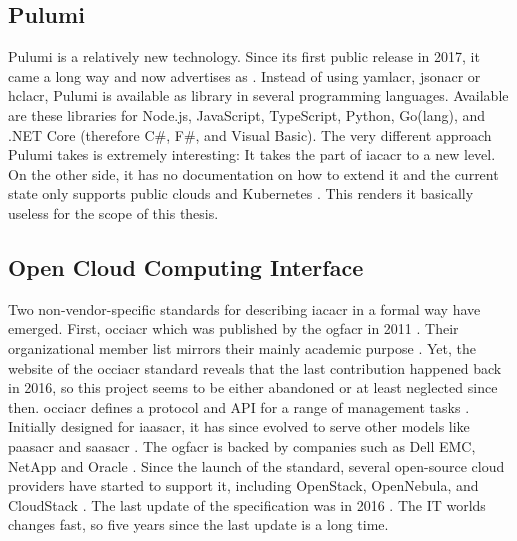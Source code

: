 \subsection{Pulumi}
Pulumi is a relatively new technology. Since its first public release in 2017, it came a long way and now advertises as  \cite{github_pulumi_first_release} \cite{github_pulumi}. Instead of using \gls{yamlacr}, \gls{jsonacr} or \gls{hclacr}, Pulumi is available as library in several programming languages. Available are these libraries for Node.js, JavaScript, TypeScript, Python, Go(lang), and .NET Core (therefore C\#, F\#, and Visual Basic).
\newline
The very different approach Pulumi takes is extremely interesting: It takes the  part of \gls{iacacr} to a new level. On the other side, it has no documentation on how to extend it and the current state only supports public clouds and Kubernetes \cite{pulumi_providers}. This renders it basically useless for the scope of this thesis.

\subsection{Open Cloud Computing Interface} %
Two non-vendor-specific standards for describing \gls{iacacr} in a formal way have emerged. First, \gls{occiacr} which was published by the \gls{ogfacr} in 2011 \cite{occi_core}. Their organizational member list mirrors their mainly academic purpose \cite{ogf_members}. Yet, the website of the \gls{occiacr} standard reveals that the last contribution happened back in 2016, so this project seems to be either abandoned or at least neglected since then.
\newline
\Gls{occiacr} defines a protocol and API for a range of management tasks \cite{occi_about}. Initially designed for \gls{iaasacr}, it has since evolved to serve other models like \gls{paasacr} and \gls{saasacr} \cite{occi_about}. The \gls{ogfacr} is backed by companies such as Dell EMC, NetApp and Oracle \cite{hpcinthecloud_next_ogf} \cite{networkworld_ogf}. Since the launch of the standard, several open-source cloud providers have started to support it, including OpenStack, OpenNebula, and CloudStack \cite{occi_implementations}. The last update of the specification was in 2016 \cite{occi_index}. The IT worlds changes fast, so five years since the last update is a long time.

